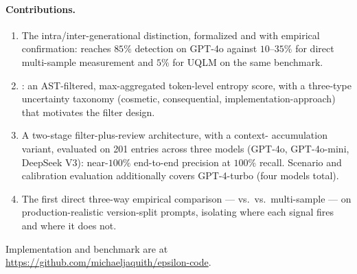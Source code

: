 \paragraph{Contributions.}
\begin{enumerate}[noitemsep]
    \item The intra/inter-generational distinction, formalized and with
    empirical confirmation: \eps reaches $85\%$ detection on GPT-4o
    against $10$--$35\%$ for direct multi-sample measurement and $5\%$ for
    UQLM on the same benchmark.
    \item \eps: an AST-filtered, max-aggregated token-level entropy score,
    with a three-type uncertainty taxonomy (cosmetic, consequential,
    implementation-approach) that motivates the filter design.
    \item A two-stage filter-plus-review architecture, with a context-%
    accumulation variant, evaluated on 201 entries across three models
    (GPT-4o, GPT-4o-mini, DeepSeek V3): near-$100\%$ end-to-end
    precision at $100\%$ recall. Scenario and calibration evaluation
    additionally covers GPT-4-turbo (four models total).
    \item The first direct three-way empirical comparison --- \eps vs.\
    \papg vs.\ multi-sample --- on production-realistic version-split
    prompts, isolating where each signal fires and where it does not.
\end{enumerate}

Implementation and benchmark are at
\url{https://github.com/michaeljaquith/epsilon-code}.
